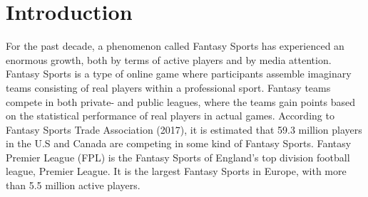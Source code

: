 
\pagestyle{fancy}
\fancyhf{}
\renewcommand{\chaptermark}[1]{\markboth{\chaptername\ \thechapter.\ #1}{}}
\renewcommand{\sectionmark}[1]{\markright{\thesection\ #1}}
\renewcommand{\headrulewidth}{0.1ex}
\renewcommand{\footrulewidth}{0.1ex}
\fancyfoot[LE,RO]{\thepage}
\fancyhead[LE]{\leftmark}
\fancyhead[RO]{\rightmark}
\fancypagestyle{plain}{\fancyhf{}\fancyfoot[LE,RO]{\thepage}\renewcommand{\headrulewidth}{0ex}}

\setcounter{page}{1}

\chapter{Introduction}\label{introduction}

\begin{comment}
Studying Fantasy Premier League is interesting for a number of reasons. Its proximity to analysis of real life football is one of them. Analysis of football matches has been an important aspect of the game for several years. Typical applications of such analysis are to get information about the opponent teams, players in the transfer market as well as information about composition of a team's existing players. Analysis are performed both before, during and after matches are played. Analysis have previously been qualitative in nature. However, nowadays quantitative analysis has gained momentum, and companies like Opta and Sportradar make profit on delivering sophisticated data sets to professional football clubs and bookmakers. In combination with the steady increase
in computational power, these data sets create new possibilities for statistical analysis in sports,
commonly referred to as sports analytics.
\end{comment}

\newpar

For the past decade, a phenomenon called Fantasy Sports has experienced an enormous growth, both by terms of active players and by media attention. Fantasy Sports is a type of online game where participants assemble imaginary teams consisting of real players within a professional sport. Fantasy teams compete in both private- and public leagues, where the teams gain points based on the statistical performance of real players in actual games. According to Fantasy Sports Trade Association (2017), it is estimated that 59.3 million players in the U.S and Canada are competing in some kind of Fantasy Sports. Fantasy Premier League (FPL) is the Fantasy Sports of England's top division football league, Premier League. It is the largest Fantasy Sports in Europe, with more than 5.5 million active players. 

